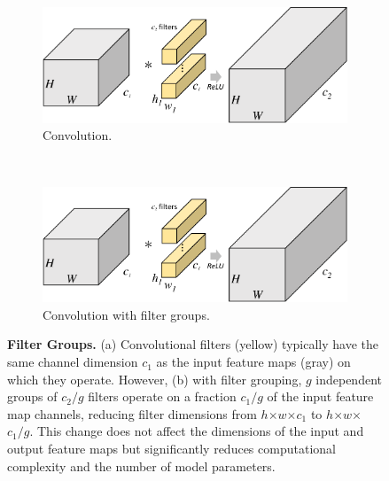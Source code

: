 \documentclass[thesis]{subfiles}
\begin{document}
	\begin{figure}[tb]
		\begin{subfigure}[b]{\linewidth}
			\centering
			\includegraphics[width=0.45\linewidth, page=1]{Figs/PDF/groupfig}
			\caption{Convolution.}
			\label{fig:normalconv}
		\end{subfigure}~
		\begin{subfigure}[b]{\linewidth}
			\centering
			\includegraphics[width=0.45\linewidth, page=2]{Figs/PDF/groupfig}
			\caption{Convolution with filter groups.}
			\label{fig:groupedconv}
		\end{subfigure}
		\caption{\textbf{Filter Groups.} (a) Convolutional filters (yellow) typically have the same channel dimension $c_1$ as the input feature maps (gray) on which they operate. However, (b) with filter grouping, $g$ independent groups of $c_2/g$ filters operate on a fraction $c_1/g$ of the input feature map channels, reducing filter dimensions from $h$$\times$$w$$\times$$c_1$ to $h$$\times$$w$$\times$$c_1/g$. This change does not affect the dimensions of the input and output feature maps but significantly reduces computational complexity and the number of model parameters.}
		\label{fig:groupconfig}
	\end{figure}
\end{document}
